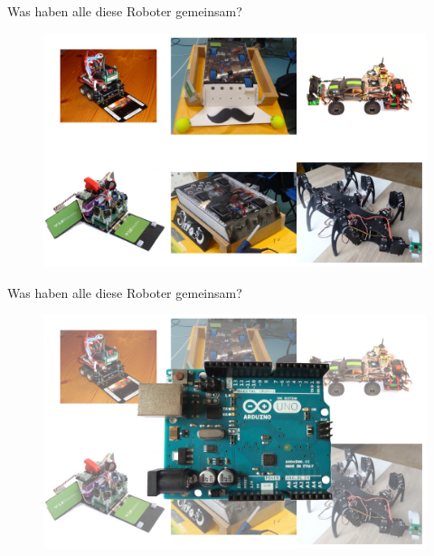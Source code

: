 \documentclass{beamer}
\begin{document}
\begin{frame}{Was haben alle diese Roboter gemeinsam?}
\begin{figure}[H]
	\centering
	\includegraphics[width=1.0\textwidth]{./images/robots-all.png}
\end{figure}
\end{frame}
\begin{frame}{Was haben alle diese Roboter gemeinsam?}
	\begin{figure}[H]
		\centering
		\includegraphics[width=1.0\textwidth]{./images/robots-all-arduino.png}
	\end{figure}
\end{frame}
\end{document}
